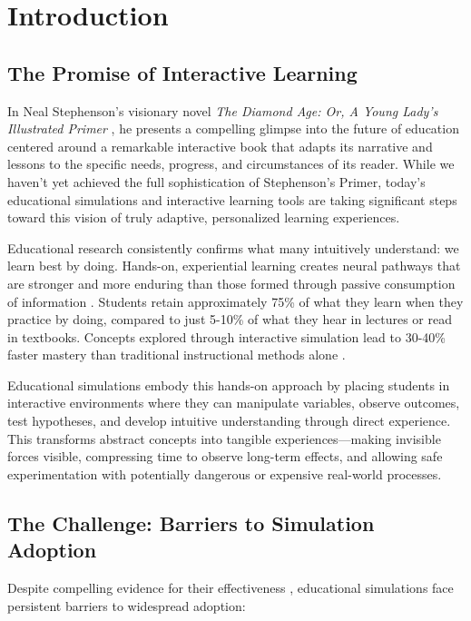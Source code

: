 \section{Introduction}

\subsection{The Promise of Interactive Learning}

In Neal Stephenson's visionary novel \textit{The Diamond Age: Or, A Young Lady's Illustrated Primer} \cite{stephenson1995}, he presents a compelling glimpse into the future of education centered around a remarkable interactive book that adapts its narrative and lessons to the specific needs, progress, and circumstances of its reader. While we haven't yet achieved the full sophistication of Stephenson's Primer, today's educational simulations and interactive learning tools are taking significant steps toward this vision of truly adaptive, personalized learning experiences.

Educational research consistently confirms what many intuitively understand: we learn best by doing. Hands-on, experiential learning creates neural pathways that are stronger and more enduring than those formed through passive consumption of information \cite{freeman2014active, prince2004active}. Students retain approximately 75\% of what they learn when they practice by doing, compared to just 5-10\% of what they hear in lectures or read in textbooks. Concepts explored through interactive simulation lead to 30-40\% faster mastery than traditional instructional methods alone \cite{wieman2008phet, rutten2012learning}.

Educational simulations embody this hands-on approach by placing students in interactive environments where they can manipulate variables, observe outcomes, test hypotheses, and develop intuitive understanding through direct experience. This transforms abstract concepts into tangible experiences---making invisible forces visible, compressing time to observe long-term effects, and allowing safe experimentation with potentially dangerous or expensive real-world processes.

\subsection{The Challenge: Barriers to Simulation Adoption}

Despite compelling evidence for their effectiveness \cite{dangelo2014simulations, merchant2014effectiveness}, educational simulations face persistent barriers to widespread adoption:

